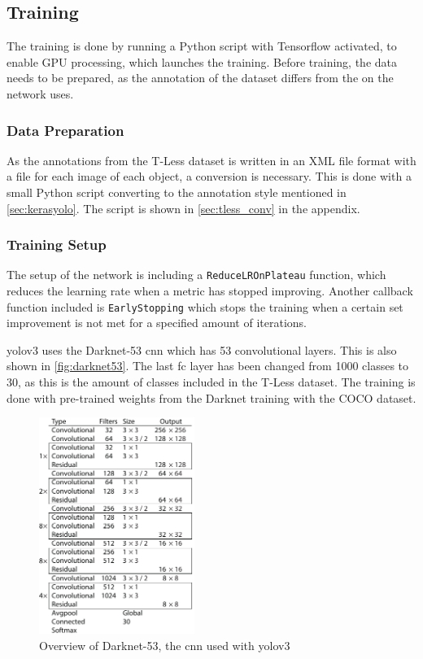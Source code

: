 \subsection{Training}
The training is done by running a Python script with Tensorflow activated, to enable GPU processing, which launches the training. Before training, the data needs to be prepared, as the annotation of the dataset differs from the on the network uses.
\subsubsection{Data Preparation}
As the annotations from the T-Less dataset is written in an XML file format with a file for each image of each object, a conversion is necessary. This is done with a small Python script converting to the annotation style mentioned in \autoref{sec:kerasyolo}. The script is shown in \autoref{sec:tless_conv} in the appendix.

\subsubsection{Training Setup}
The setup of the network is including a \lstinline{ReduceLROnPlateau} function, which reduces the learning rate when a metric has stopped improving. Another callback function included is \lstinline{EarlyStopping} which stops the training when a certain set improvement is not met for a specified amount of iterations.

\gls{yolo}v3 uses the Darknet-53 \gls{cnn} which has 53 convolutional layers. This is also shown in \autoref{fig:darknet53}. The last \gls{fc} layer has been changed from 1000 classes to 30, as this is the amount of classes included in the T-Less dataset. The training is done with pre-trained weights from the Darknet training with the COCO dataset.

\begin{figure}[H]
	\centering
	\includegraphics[width=0.45\textwidth]{figures/darknet53}
	\caption{Overview of Darknet-53, the \gls{cnn} used with \gls{yolo}v3 \citep{Redmon2018}}
	\label{fig:darknet53}
\end{figure}

